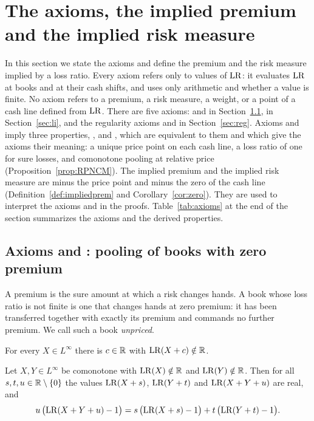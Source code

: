 \section{The axioms, the implied premium and the implied risk measure}\label{sec:axioms}

In this section we state the axioms and define the premium and the risk measure implied by a loss ratio. Every
axiom refers only to values of $\mathrm{LR}$: it evaluates $\mathrm{LR}$ at books and at their cash shifts, and uses only
arithmetic and whether a value is finite. No axiom refers to a premium, a risk measure, a weight, or a point
of a cash line defined from $\mathrm{LR}$. There are five axioms: \axPe{} and \axR{} in Section~\ref{sec:R}, \axLI{} in
Section~\ref{sec:li}, and the regularity axioms \axRC{} and \axRM{} in Section~\ref{sec:reg}. Axioms \axPe{} and
\axR{} imply three properties, \axP, \axN{} and \axCM, which are equivalent to them and which give the axioms
their meaning: a unique price point on each cash line, a loss ratio of one for sure losses, and comonotone pooling
at relative price (Proposition~\ref{prop:RPNCM}). The implied premium and the implied risk measure are minus
the price point and minus the zero of the cash line (Definition~\ref{def:impliedprem} and
Corollary~\ref{cor:zero}). They are used to interpret the axioms and in the proofs. Table~\ref{tab:axioms} at the
end of the section summarizes the axioms and the derived properties.

\subsection{Axioms \axPe{} and \axR: pooling of books with zero premium}\label{sec:R}

A premium is the sure amount at which a risk changes hands. A book whose loss ratio is not finite is one that
changes hands at zero premium: it has been transferred together with exactly its premium and commands no further
premium. We call such a book \emph{unpriced}.

\begin{axiom}\label{ax:Pex}
For every $X\in L^\infty$ there is $c\in\mathbb R$ with $\mathrm{LR}(X+c)\notin\mathbb R$.
\end{axiom}

\begin{axiom}\label{ax:R}
Let $X,Y\in L^\infty$ be comonotone with $\mathrm{LR}(X)\notin\mathbb R$ and $\mathrm{LR}(Y)\notin\mathbb R$. Then for all
$s,t,u\in\mathbb R\setminus\{0\}$ the values $\mathrm{LR}(X+s)$, $\mathrm{LR}(Y+t)$ and $\mathrm{LR}(X+Y+u)$ are real, and
\begin{equation}\label{eq:R}
 u\,\bigl(\mathrm{LR}(X+Y+u)-1\bigr)=s\,\bigl(\mathrm{LR}(X+s)-1\bigr)+t\,\bigl(\mathrm{LR}(Y+t)-1\bigr).
\end{equation}
\end{axiom}

